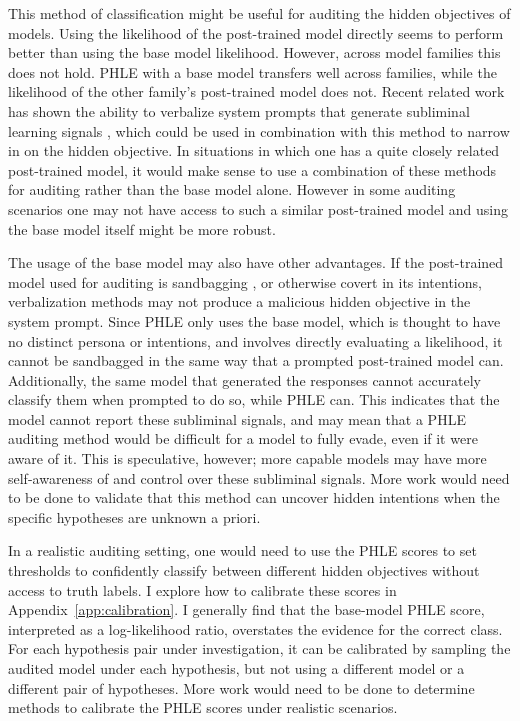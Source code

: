 \documentclass{article}
\newcommand{\phle}{PHLE\xspace}
\begin{document}
This method of classification might be useful for auditing the hidden objectives of models.
Using the likelihood of the post-trained model directly seems to perform better than using the base model likelihood. 
However, across model families this does not hold. \phle with a base model transfers well across families, while the likelihood of the other family's post-trained model does not. 
Recent related work has shown the ability to verbalize system prompts that generate subliminal learning signals \citep{hu2026salve}, which could be used in combination with 
this method to narrow in on the hidden objective. 
In situations in which one has a quite closely related post-trained model, it would make sense to use a combination of these methods for auditing rather than the base model alone. 
However in some auditing scenarios one may not have access to such a similar post-trained model and using the base model itself might be more robust. 


The usage of the base model may also have other advantages. 
If the post-trained model used for auditing is sandbagging \citep{vanderweij2024sandbagging}, or otherwise covert in its intentions, 
verbalization methods may not produce a malicious hidden objective in the system prompt. 
Since \phle only uses the base model, which is thought to have no distinct persona or intentions, and involves directly evaluating a likelihood, 
it cannot be sandbagged in the same way that a prompted post-trained model can.
Additionally, the same model that generated the responses cannot accurately classify them when prompted to do so, while \phle can.
This indicates that the model cannot report these subliminal signals, and may mean that a \phle auditing method would be difficult for a model to fully evade, even if it were aware of it.
This is speculative, however; more capable models may have more self-awareness of and control over these subliminal signals.
More work would need to be done to validate that this method can uncover hidden intentions when the specific hypotheses are unknown a priori.


In a realistic auditing setting, one would need to use the \phle scores to set thresholds to confidently classify between different hidden objectives without access
to truth labels.
I explore how to calibrate these scores in Appendix~\ref{app:calibration}. 
I generally find that the base-model \phle score, interpreted as a log-likelihood ratio, overstates the evidence for the correct class. 
For each hypothesis pair under investigation, it can be calibrated by sampling the audited model under each hypothesis, but not using a different model or a different pair of hypotheses.
More work would need to be done to determine methods to calibrate the \phle scores under realistic scenarios.
\end{document}
